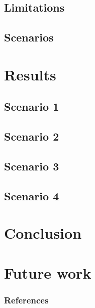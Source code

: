 \documentclass[9pt]{beamer}
\begin{document}
\subsection{Limitations}

\subsection{Scenarios}

\section{Results}
\subsection{Scenario 1}

\subsection{Scenario 2}

\subsection{Scenario 3}

\subsection{Scenario 4}

\section{Conclusion}

\section{Future work}


\begin{frame}[allowframebreaks]
  \frametitle{References}
  \footnotesize 
  {  }

\end{frame}

\end{document}
